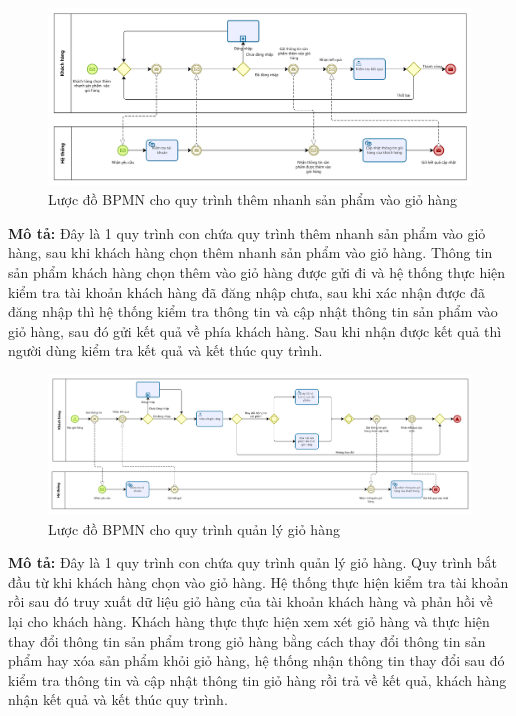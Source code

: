 \begin{figure}[!htp]
	\centering
	\includegraphics[width=15cm]{img/BPMN/customer_buy/customer_add_fast.png}
	\newline
	\caption{Lược đồ BPMN cho quy trình thêm nhanh sản phẩm vào giỏ hàng}
\end{figure}
\textbf{Mô tả:} Đây là 1 quy trình con chứa quy trình thêm nhanh sản phẩm vào giỏ hàng, sau khi khách hàng chọn thêm nhanh sản phẩm vào giỏ hàng. Thông tin sản phẩm khách hàng chọn thêm vào giỏ hàng được gửi đi và hệ thống thực hiện kiểm tra tài khoản khách hàng đã đăng nhập chưa, sau khi xác nhận được đã đăng nhập thì hệ thống kiểm tra thông tin và cập nhật thông tin sản phẩm vào giỏ hàng, sau đó gửi kết quả về phía khách hàng. Sau khi nhận được kết quả thì người dùng kiểm tra kết quả và kết thúc quy trình.

\begin{figure}[!htp]
	\centering
	\includegraphics[width=15cm]{img/BPMN/customer_buy/customer_cart.png}
	\newline
	\caption{Lược đồ BPMN cho quy trình quản lý giỏ hàng}
\end{figure}
\textbf{Mô tả:} Đây là 1 quy trình con chứa quy trình quản lý giỏ hàng. Quy trình bắt đầu từ khi khách hàng chọn vào giỏ hàng. Hệ thống thực hiện kiểm tra tài khoản rồi sau đó truy xuất dữ liệu giỏ hàng của tài khoản khách hàng và phản hồi về lại cho khách hàng. Khách hàng thực thực hiện xem xét giỏ hàng và thực hiện thay đổi thông tin sản phẩm trong giỏ hàng bằng cách thay đổi thông tin sản phẩm hay xóa sản phẩm khỏi giỏ hàng, hệ thống nhận thông tin thay đổi sau đó kiểm tra thông tin và cập nhật thông tin giỏ hàng rồi trả về kết quả, khách hàng nhận kết quả và kết thúc quy trình.

